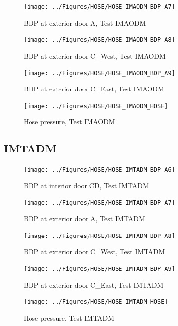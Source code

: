 \documentclass[11pt,oneside]{book}
\begin{document}
\begin{figure}[!ht]
\texttt{[image: ../Figures/HOSE/HOSE\_IMAODM\_BDP\_A7]}
\caption{BDP at exterior door A, Test IMAODM}
\label{fig:HOSE_IMAODM_BDP_A7}
\end{figure}

\begin{figure}[!ht]
\texttt{[image: ../Figures/HOSE/HOSE\_IMAODM\_BDP\_A8]}
\caption{BDP at exterior door C\_West, Test IMAODM}
\label{fig:HOSE_IMAODM_BDP_A8}
\end{figure}

\begin{figure}[!ht]
\texttt{[image: ../Figures/HOSE/HOSE\_IMAODM\_BDP\_A9]}
\caption{BDP at exterior door C\_East, Test IMAODM}
\label{fig:HOSE_IMAODM_BDP_A9}
\end{figure}

\begin{figure}[!ht]
\texttt{[image: ../Figures/HOSE/HOSE\_IMAODM\_HOSE]}
\caption{Hose pressure, Test IMAODM}
\label{fig:HOSE_IMAODM_HOSE}
\end{figure}


\clearpage


\subsection{IMTADM}

\begin{figure}[!ht]
\texttt{[image: ../Figures/HOSE/HOSE\_IMTADM\_BDP\_A6]}
\caption{BDP at interior door CD, Test IMTADM}
\label{fig:HOSE_IMTADM_BDP_A6}
\end{figure}

\begin{figure}[!ht]
\texttt{[image: ../Figures/HOSE/HOSE\_IMTADM\_BDP\_A7]}
\caption{BDP at exterior door A, Test IMTADM}
\label{fig:HOSE_IMTADM_BDP_A7}
\end{figure}

\begin{figure}[!ht]
\texttt{[image: ../Figures/HOSE/HOSE\_IMTADM\_BDP\_A8]}
\caption{BDP at exterior door C\_West, Test IMTADM}
\label{fig:HOSE_IMTADM_BDP_A8}
\end{figure}

\begin{figure}[!ht]
\texttt{[image: ../Figures/HOSE/HOSE\_IMTADM\_BDP\_A9]}
\caption{BDP at exterior door C\_East, Test IMTADM}
\label{fig:HOSE_IMTADM_BDP_A9}
\end{figure}

\begin{figure}[!ht]
\texttt{[image: ../Figures/HOSE/HOSE\_IMTADM\_HOSE]}
\caption{Hose pressure, Test IMTADM}
\label{fig:HOSE_IMTADM_HOSE}
\end{figure}
\end{document}
